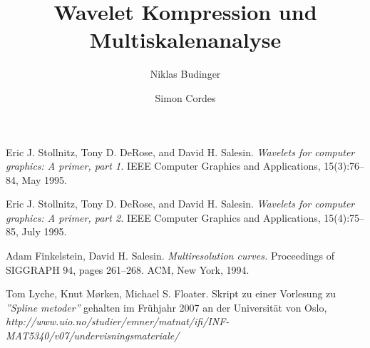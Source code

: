 \documentclass{article}
\begin{document}
%
\title{Wavelet Kompression und Multiskalenanalyse}
\author{Niklas Budinger \and Simon Cordes}
\maketitle




%





\begin{thebibliography}{9}

Eric J. Stollnitz, Tony D. DeRose, and David H. Salesin.
\textit{Wavelets for computer graphics: A primer, part 1.}
IEEE Computer Graphics and Applications, 15(3):76–84,
May 1995.

Eric J. Stollnitz, Tony D. DeRose, and David H. Salesin.
\textit{Wavelets for computer graphics: A primer, part 2.}
IEEE Computer Graphics and Applications, 15(4):75–85,
July 1995.

Adam Finkelstein, David H. Salesin.
\textit{Multiresolution curves.}
Proceedings of SIGGRAPH 94, pages 261–268.
ACM, New York, 1994.

Tom Lyche, Knut Mørken, Michael S. Floater.
Skript zu einer Vorlesung zu \textit{''Spline metoder''} gehalten im Frühjahr 2007 an der Universität von Oslo,
\textit{http://www.uio.no/studier/emner/matnat/ifi/INF-MAT5340/v07/undervisningsmateriale/}

\end{thebibliography}
\end{document}
